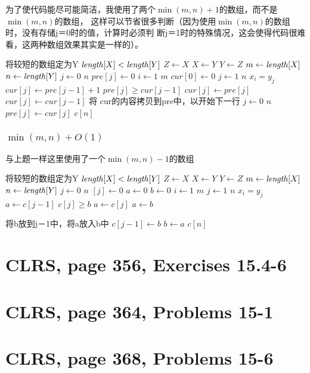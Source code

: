 \documentclass{article}
\begin{document}
\begin{CJK}{UTF8}{gbsn}
为了使代码能尽可能简洁，我使用了两个$\min(m,n)+1$的数组，而不是$\min(m,n)$的数组，
这样可以节省很多判断（因为使用$\min(m,n)$的数组时，没有存储j＝0时的值，计算时必须判
断j＝1时的特殊情况，这会使得代码很难看，这两种数组效果其实是一样的）。
\begin{codebox}
\li \Comment 将较短的数组定为Y
\li \If $\id{length}[X] < \id{length}[Y]$
\li 	\Then $Z \gets X$
\li				$X \gets Y$
\li				$Y \gets Z$
	 	\End
\li $m \gets \id{length}[X]$
\li $n \gets \id{length}[Y]$
\li \For $j \gets 0$ \To $n$
\li 	\Do $pre[j] \gets 0$
		\End
\li \For $i \gets 1$ \To $m$
\li 	\Do $cur[0] \gets 0$
\li			\For $ j \gets 1 $ \To $n$
\li			\Do \If $x_i = y_j$
\li					\Then $cur[j] \gets pre[j-1]+1$
\li					\Else	\If $pre[j] \geq cur[j-1]$
\li								\Then $cur[j] \gets pre[j]$
\li								\Else $cur[j] \gets cur[j-1]$
								\End
					\End
			\End		
\li			\Comment 将 cur的内容拷贝到pre中，以开始下一行
\li			\For $ j \gets 0$ \To $n$
\li				\Do $pre[j] \gets cur[j]$
				\End
		\End
\li \Return $c[n]$
\end{codebox}

\subsubsection*{$\min(m,n) + O(1)$}

与上题一样这里使用了一个$\min(m,n) - 1$的数组

\begin{codebox}
\li \Comment 将较短的数组定为Y
\li \If $\id{length}[X] < \id{length}[Y]$
\li 	\Then $Z \gets X$
\li				$X \gets Y$
\li				$Y \gets Z$
	 	\End
\li $m \gets \id{length}[X]$
\li $n \gets \id{length}[Y]$
\li \For $j \gets 0$ \To $n$
\li 	\Do $[j] \gets 0$
		\End
\li $a \gets 0$
\li $b \gets 0$		
\li \For $i \gets 1$ \To $m$
\li 	\Do \For $ j \gets 1 $ \To $n$
\li			\Do \If $x_i = y_j$
\li					\Then $a \gets c[j-1]$
\li					\Else	\If $c[j] \geq b$
\li								\Then $a \gets c[j]$
\li								\Else $a \gets b$
								\End
					\End
					
\li				\Comment 将b放到j－1中，将a放入b中
\li				$c[j-1] \gets b$
\li				$b \gets a$
			\End		
		\End
\li \Return $c[n]$
\end{codebox}

\section{CLRS, page 356, Exercises 15.4-6}

\section{CLRS, page 364, Problems 15-1}

\section{CLRS, page 368, Problems 15-6}

\end{CJK}
\end{document}
